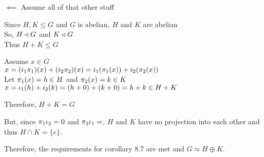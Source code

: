 \documentclass[letterpaper,12pt,fleqn]{article}
\begin{document}
\begin{description}
\item $\impliedby$ Assume all of that other stuff

  Since $H,K\le G$ and $G$ is abelian, $H$ and $K$ are abelian \\
  So, $H\mathrel{\triangleleft} G$ and $K\mathrel{\triangleleft} G$ \\
  Thus $H+K\le G$

  Assume $x\in G$ \\
  $x=(i_1\pi_1)(x)+(i_2\pi_2)(x)=i_1(\pi_1(x))+i_2(\pi_2(x))$ \\
  Let $\pi_1(x)=h\in H$ and $\pi_2(x)=k\in K$ \\
  $x=\iota_1(h)+i_2(k)=(h+0)+(k+0)=h+k\in H+K$

  Therefore, $H+K=G$

  But, since $\pi_1\iota_2=0$ and $\pi_2\iota_1=$, $H$ and $K$ have no projection into
  each other and thus $H\cap K=\{e\}$.

  Therefore, the requirements for corollary 8.7 are met and
  $G\simeq H\oplus K$.
\end{description}
\end{document}
